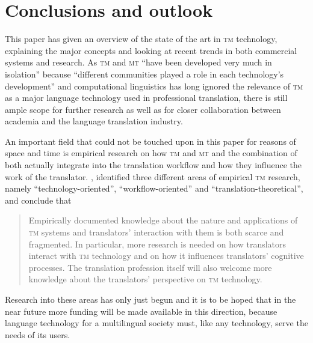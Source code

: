 \documentclass[output=paper]{LSP/langsci}
\begin{document}
\section{Conclusions and outlook}\label{sec:reinke:4}
 
This paper has given an overview of the state of the art in \textsc{tm} technology, explaining the major concepts and looking at recent trends in both commercial systems and research. As \textsc{tm} and \textsc{mt} ``have been developed very much in isolation'' because ``different communities played a role in each technology's development'' \citep{KoehnSenellart2010} and computational linguistics has long ignored the relevance of \textsc{tm} as a major language technology used in professional translation, there is still ample scope for further research as well as for closer collaboration between academia and the language translation industry.
 
An important field that could not be touched upon in this paper for reasons of space and time is empirical research on how \textsc{tm} and \textsc{mt} and the combination of both actually integrate into the translation workflow and how they influence the work of the translator. \citet[99]{Christensen2010}, identified three different areas of empirical \textsc{tm} research, namely ``technology-oriented'', ``workflow-oriented'' and ``translation-theoretical'', and conclude that  

\begin{quotation}
Empirically documented knowledge about the nature and applications of \textsc{tm} systems and translators' interaction with them is both scarce and fragmented. In particular, more research is needed on how translators interact with \textsc{tm} technology and on how it influences translators' cognitive processes. The translation profession itself will also welcome more knowledge about the translators' perspective on \textsc{tm} technology. \citep[99]{Christensen2010}
\end{quotation}

Research into these areas has only just begun and it is to be hoped that in the near future more funding will be made available in this direction, because language technology for a multilingual society must, like any technology, serve the needs of its users.

\sloppy
\printbibliography[heading=subbibliography,notkeyword=this]
\end{document}
